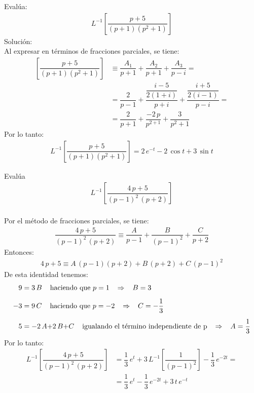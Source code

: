 \begin{ejemplo} Evalúa:
\begin{align*}
L^{-1} \left[ \dfrac{p + 5}{(p + 1)(p^{2} + 1)} \right]
\end{align*}
\noindent Solución:
\\[0.5em]
Al expresar en términos de fracciones parciales, se tiene:
\begin{align*}
\left[ \dfrac{p + 5}{(p + 1)(p^{2} + 1)} \right] &\equiv \dfrac{A_{1}}{p + 1} + \dfrac{A_{2}}{p + 1} + \dfrac{A_{3}}{p - i} = \\[0.5em]
&= \dfrac{2}{p -1} + \dfrac{\dfrac{i - 5}{2(1 + i)}}{p + i} + \dfrac{\dfrac{i + 5}{2(i - 1)}}{p - i} = \\[0.5em]
&= \dfrac{2}{p + 1} + \dfrac{-2 \, p}{p^{2 + 1}} + \dfrac{3}{p^2 + 1}
\end{align*}
Por lo tanto:
\begin{align*}
L^{-1} \left[ \dfrac{p + 5}{(p + 1)(p^{2} + 1)} \right] = 2 \, e^{-t} - 2 \, \cos t +  3 \, \sin t
\end{align*}
\end{ejemplo}
\begin{ejemplo}
Evalúa
\begin{align*}
L^{-1} \left[ \dfrac{4 \, p + 5}{(p - 1)^{2} \, (p + 2)} \right]
\end{align*}
\\[0.5em]
Por el método de fracciones parciales, se tiene:
\begin{align*}
\dfrac{4 \, p + 5}{(p - 1)^{2} \, (p + 2)} \equiv \dfrac{A}{p - 1} + \dfrac{B}{(p - 1)^{2}} + \dfrac{C}{p + 2}
\end{align*}
Entonces:
\begin{align*}
4 \, p + 5 \equiv A \, (p - 1)(p + 2) + B \, (p + 2) + C \, (p - 1)^{2}
\end{align*}
De esta identidad tenemos:
\begin{align*}
9 &= 3 \, B \hspace{0.4cm} \mbox{haciendo que } p = 1 \hspace{0.3cm} \Rightarrow \hspace{0.3cm} B = 3 \\[0.5em]
- 3 &= 9 \, C \hspace{0.4cm} \mbox{haciendo que } p = -2 \hspace{0.3cm} \Rightarrow \hspace{0.3cm} C = -\dfrac{1}{3} \\[0.5em]
5 &= -2 \, A {+}  2 \, B {+} C \hspace{0.4cm} \mbox{igualando el término independiente de p} \hspace{0.3cm} \Rightarrow \hspace{0.3cm} A = \dfrac{1}{3}
\end{align*}
Por lo tanto:
\begin{align*}
L^{-1} \left[ \dfrac{4 \, p + 5}{(p - 1)^{2} \, (p + 2)} \right] &= \dfrac{1}{3} \, e^{t} +  3 \, L^{-1} \left[\dfrac{1}{(p - 1)^{2}} \right] - \dfrac{1}{3} \, e^{-2 t} = \\[0.5em]
&= \dfrac{1}{3} \, e^{t} - \dfrac{1}{3} \, e^{- 2 t} + 3 \, t \, e^{-t}
\end{align*}
\end{ejemplo}


